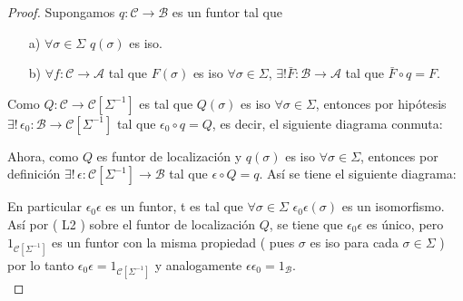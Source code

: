 \documentclass{article}
\begin{document}
	\begin{proof}
		Supongamos $q:\mathscr{C}\to \mathscr{B}$ es un funtor tal que 
		\begin{itemize}
			\item[a)] $\forall \sigma\in \Sigma$ \quad $q(\sigma)$ es iso.
			\item[b)] $\forall f:\mathscr{C}\to \mathscr{A}$ tal que $F(\sigma)$ es iso $\forall \sigma\in \Sigma$, $\exists ! \bar{F}:\mathscr{B}\to\mathscr{A}$
			tal que $\bar{F}\circ q=F$.\\
		\end{itemize}
		
		Como $Q:\mathscr{C}\to\mathscr{C}[\Sigma^{-1}]$ es tal que $Q(\sigma)$ es iso $\forall \sigma \in \Sigma$, entonces por 
		hipótesis $\exists !\,\epsilon_0:\mathscr{B}\to \mathscr{C}[\Sigma^{-1}]$ tal que $\epsilon_0\circ q=Q$, es decir, el siguiente diagrama conmuta:\\
		\centerline{
		}
		Ahora, como $Q$ es funtor de localización y $q(\sigma)$ es iso $\forall \sigma\in \Sigma$, entonces por definición 
		$\exists !\,\epsilon:\mathscr{C}[\Sigma^{-1}]\to \mathscr{B}$ tal que $\epsilon\circ Q=q$. Así se tiene el siguiente diagrama:\\
		\centerline{
		}
		
		En particular $\epsilon_0\epsilon$ es un funtor, t es tal que $\forall \sigma\in \Sigma$ $\epsilon_0\epsilon(\sigma)$ es un isomorfismo. Así por ( L2 )
		sobre el funtor de localización $Q$, se tiene que $\epsilon_0\epsilon$ es único, pero $1_{\mathscr{C}[\Sigma^{-1}]}$ es un funtor con la misma
		propiedad ( pues $\sigma$ es iso para cada $\sigma \in \Sigma$  ) por lo tanto $\epsilon_0\epsilon=1_{\mathscr{C}[\Sigma^{-1}]}$ y analogamente
		$\epsilon\epsilon_0=1_{\mathscr{B}}$.\\
	\end{proof}
\end{document}
